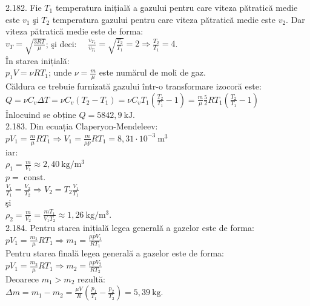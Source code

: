 2.182. Fie $T_{1}$ temperatura inițială a gazului pentru care viteza pătratică medie este $v_{1}$ şi $T_{2}$ temperatura gazului pentru care viteza pătratică medie este $v_{2}$. Dar viteza pătratică medie este de forma:\\ $v_{T}=\sqrt{\frac{3 R T}{\mu}}$; şi deci: $\quad \frac{v_{T_{2}}}{v_{T_{1}}}=\sqrt{\frac{T_{2}}{T_{1}}}=2 \Rightarrow \frac{T_{2}}{T_{1}}=4$.\\ În starea inițială:\\ $p_{1} V=\nu R T_{1}$; unde $\nu=\frac{m}{\mu}$ este numărul de moli de gaz.\\ Căldura ce trebuie furnizată gazului într-o transformare izocoră este:\\ $Q=\nu C_{v} \Delta T=\nu C_{v}\left(T_{2}-T_{1}\right)=\nu C_{v} T_{1}\left(\frac{T_{2}}{T_{1}}-1\right)=\frac{m}{\mu} \frac{5}{2} R T_{1}\left(\frac{T_{2}}{T_{1}}-1\right)$\\ Înlocuind se obține $Q=5842,9 \mathrm{~kJ}$.\\

2.183. Din ecuația Claperyon-Mendeleev:\\ $p V_{1}=\frac{m}{\mu} R T_{1} \Rightarrow V_{1}=\frac{m}{\mu p} R T_{1}=8,31 \cdot 10^{-3} \mathrm{~m}^{3}$\\ iar:\\ $\rho_{1}=\frac{m}{V_{1}} \approx 2,40 \mathrm{~kg} / \mathrm{m}^{3}$\\ $p=\text { const. }$\\ $\frac{V_{1}}{T_{1}}=\frac{V_{2}}{T_{2}} \Rightarrow V_{2}=T_{2} \frac{V_{1}}{T_{1}}$\\ şi\\ $\rho_{2}=\frac{m}{V_{2}}=\frac{m T_{1}}{V_{1} T_{2}} \approx 1,26 \mathrm{~kg} / \mathrm{m}^{3}$.\\

2.184. Pentru starea inițială legea generală a gazelor este de forma:\\ $p V_{1}=\frac{m_{1}}{\mu} R T_{1} \Rightarrow m_{1}=\frac{\mu p V_{1}}{R T_{1}}$\\ Pentru starea finală legea generală a gazelor este de forma:\\ $p V_{1}=\frac{m_{2}}{\mu} R T_{1} \Rightarrow m_{2}=\frac{\mu p V_{2}}{R T_{2}}$\\ Deoarece $m_{1}>m_{2}$ rezultă:\\ $\Delta m=m_{1}-m_{2}=\frac{\mu V}{R}\left(\frac{p_{1}}{T_{1}}-\frac{p_{2}}{T_{2}}\right)=5,39 \mathrm{~kg}$.\\

